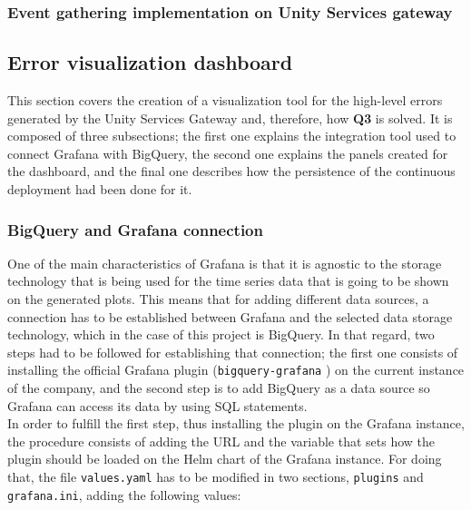 \documentclass[english, 12pt, a4paper, sci, utf8, a-1b, online]{aaltothesis}
\begin{document}
\subsubsection{Event gathering implementation on Unity Services gateway}

\subsection{Error visualization dashboard}



This section covers the creation of a visualization tool for the high-level errors generated by the Unity Services Gateway and, therefore, how \textbf{Q3} is solved. It is composed of three subsections; the first one explains the integration tool used to connect Grafana with BigQuery, the second one explains the panels created for the dashboard, and the final one describes how the persistence of the continuous deployment had been done for it.

\subsubsection{BigQuery and Grafana connection}

One of the main characteristics of Grafana is that it is agnostic to the storage technology that is being used for the time series data that is going to be shown on the generated plots. This means that for adding different data sources, a connection has to be established between Grafana and the selected data storage technology, which in the case of this project is BigQuery. In that regard, two steps had to be followed for establishing that connection; the first one consists of installing the official Grafana plugin (\texttt{bigquery-grafana} \cite{GrafanaPlugin}) on the current instance of the company, and the second step is to add BigQuery as a data source so Grafana can access its data by using SQL statements.\\

In order to fulfill the first step, thus installing the plugin on the Grafana instance, the procedure consists of adding the URL and the variable that sets how the plugin should be loaded on the Helm chart of the Grafana instance. For doing that, the file \texttt{values.yaml} has to be modified in two sections, \texttt{plugins} and \texttt{grafana.ini}, adding the following values:\\
\end{document}
